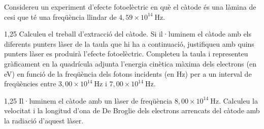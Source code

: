Considereu un experiment d'efecte fotoelèctric en què el càtode és una làmina de cesi que té una freqüència llindar de $4,59\times 10^{14}\ \mathrm{Hz}$.

\begin{apartat}{1,25}
Calculeu el treball d'extracció del càtode. Si il·luminem el càtode amb els diferents punters làser de la taula que hi ha a continuació, justifiqueu amb quins punters làser es produirà l'efecte fotoelèctric. Completeu la taula i representeu gràficament en la quadrícula adjunta l'energia cinètica màxima dels electrons (en eV) en funció de la freqüència dels fotons incidents (en Hz) per a un interval de freqüències entre $3,00\times 10^{14}\ \mathrm{Hz}$ i $7,00\times 10^{14}\ \mathrm{Hz}$.

\begin{center}
\end{center}

\end{apartat}

\begin{apartat}{1,25}
Il·luminem el càtode amb un làser de freqüència $8,00\times 10^{14}\ \mathrm{Hz}$. Calculeu la velocitat i la longitud d'ona de De Broglie dels electrons arrencats del càtode amb la radiació d'aquest làser.
\end{apartat}

